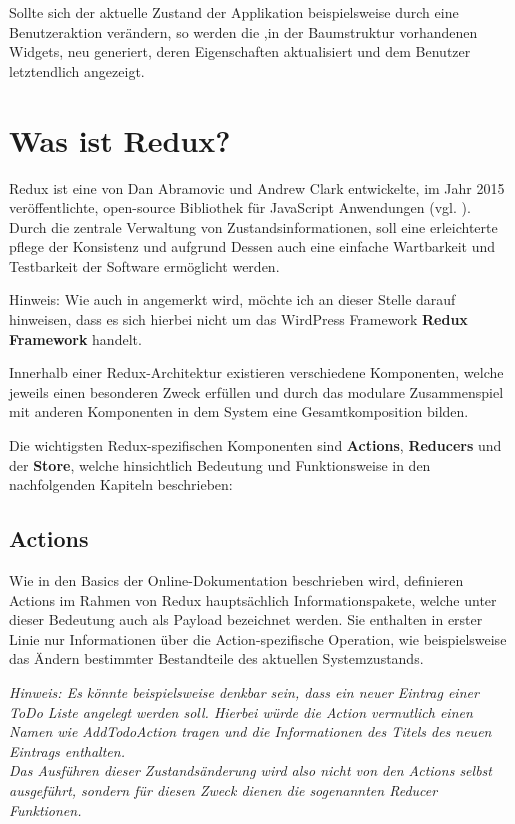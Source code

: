 \documentclass[bibliography=totoc,listof=totoc,BCOR=5mm,DIV=12,oneside]{scrbook}
\begin{document}
\par Sollte sich der aktuelle Zustand der Applikation beispielsweise durch eine Benutzeraktion verändern, so werden die ,in der Baumstruktur vorhandenen Widgets, neu generiert, deren Eigenschaften aktualisiert und dem Benutzer letztendlich angezeigt.

\newpage		
\section{Was ist Redux?}
\par Redux ist eine von Dan Abramovic und Andrew Clark entwickelte, im Jahr 2015 veröffentlichte,  open-source Bibliothek für JavaScript Anwendungen (vgl. \citep{ReduxWiki}). Durch die zentrale Verwaltung von Zustandsinformationen, soll eine erleichterte pflege der Konsistenz und aufgrund Dessen auch eine \grqq einfache\grqq{} Wartbarkeit und Testbarkeit der Software ermöglicht werden. \citep[vgl. Abschnitt Read Me]{ReduxReadMe}
\par \bigskip Hinweis: Wie auch in \citep[vgl. Abschnitt Read Me]{ReduxReadMe} angemerkt wird, möchte ich an dieser Stelle darauf hinweisen, dass es sich hierbei nicht um das WirdPress Framework \textbf{Redux Framework}\citep{WordPressRedux} handelt.

\par Innerhalb einer Redux-Architektur existieren verschiedene Komponenten, welche jeweils einen besonderen Zweck erfüllen und durch das modulare Zusammenspiel mit anderen Komponenten in dem System eine Gesamtkomposition bilden.
\par \bigskip Die wichtigsten Redux-spezifischen Komponenten sind \textbf{Actions}, \textbf{Reducers} und der \textbf{Store}, welche hinsichtlich Bedeutung und Funktionsweise in den nachfolgenden Kapiteln beschrieben:

\subsection{Actions}
\par Wie in den Basics der Online-Dokumentation \citep{ReduxActions} beschrieben wird, definieren Actions im Rahmen von Redux hauptsächlich Informationspakete, welche unter dieser Bedeutung auch als \grqq Payload\grqq{} bezeichnet werden. Sie enthalten in erster Linie nur Informationen über die Action-spezifische Operation, wie beispielsweise das Ändern bestimmter Bestandteile des aktuellen Systemzustands.
\par \bigskip \textit{Hinweis: Es könnte beispielsweise denkbar sein, dass ein neuer Eintrag einer ToDo Liste angelegt werden soll. Hierbei würde die Action vermutlich einen Namen wie \grqq AddTodoAction\grqq{} tragen und die Informationen des Titels des neuen Eintrags enthalten. \\
Das Ausführen dieser Zustandsänderung wird also nicht von den Actions selbst ausgeführt, sondern für diesen Zweck dienen die sogenannten Reducer Funktionen.}
\end{document}
